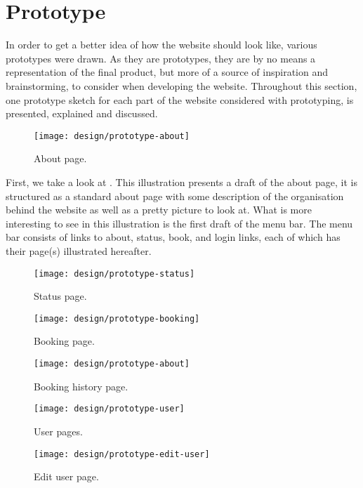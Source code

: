 \section{Prototype}
In order to get a better idea of how the website should look like, various prototypes were drawn.
As they are prototypes, they are by no means a representation of the final product, but more of a source of inspiration and brainstorming, to consider when developing the website.
Throughout this section, one prototype sketch for each part of the website considered with prototyping, is presented, explained and discussed.

\begin{figure}[h]
	\centering
	\texttt{[image: design/prototype-about]}
	\caption{About page.}\label{fig:prototype-about}
\end{figure}

First, we take a look at .
This illustration presents a draft of the about page, it is structured as a standard about page with some description of the organisation behind the website as well as a pretty picture to look at.
What is more interesting to see in this illustration is the first draft of the menu bar.
The menu bar consists of links to about, status, book, and login links, each of which has their page(s) illustrated hereafter.


\begin{figure}[h]
	\centering
	\texttt{[image: design/prototype-status]}
	\caption{Status page.}\label{fig:prototype-status}
\end{figure}

\begin{figure}[h]
	\centering
	\texttt{[image: design/prototype-booking]}
	\caption{Booking page.}\label{fig:prototype-book}
\end{figure}

\begin{figure}[h]
	\centering
	\texttt{[image: design/prototype-about]}
	\caption{Booking history page.}\label{fig:prototype-book-history}
\end{figure}

\begin{figure}[h]
	\centering
	\texttt{[image: design/prototype-user]}
	\caption{User pages.}\label{fig:prototype-user-overall}
\end{figure}

\begin{figure}[h]
	\centering
	\texttt{[image: design/prototype-edit-user]}
	\caption{Edit user page.}\label{fig:prototype-edit-user}
\end{figure}
